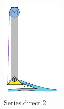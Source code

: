 \begin{figure}[hb!]
\begin{subfigure}{.19\textwidth}
    \includegraphics[width=\linewidth]{figures/illustration_serial_direct_ii.pdf}
    \caption{Series direct 2}
    \label{fig:series_direct_ii}
  \end{subfigure}
  \begin{subfigure}{.19\textwidth}
    \centering

\end{subfigure}
\end{figure}
